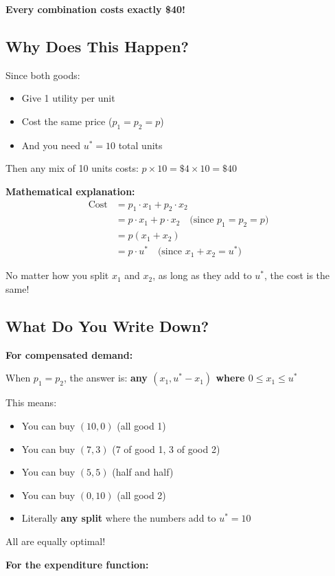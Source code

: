 \documentclass[11pt]{article}
\begin{document}
\textbf{Every combination costs exactly \$40!}

\subsection{Why Does This Happen?}

Since both goods:
\begin{itemize}
\item Give 1 utility per unit
\item Cost the same price ($p_1 = p_2 = p$)
\item And you need $u^* = 10$ total units
\end{itemize}

Then any mix of 10 units costs: $p \times 10 = \$4 \times 10 = \$40$

\textbf{Mathematical explanation:}
\begin{align*}
\text{Cost} &= p_1 \cdot x_1 + p_2 \cdot x_2 \\
&= p \cdot x_1 + p \cdot x_2 \quad \text{(since $p_1 = p_2 = p$)} \\
&= p(x_1 + x_2) \\
&= p \cdot u^* \quad \text{(since $x_1 + x_2 = u^*$)}
\end{align*}

No matter how you split $x_1$ and $x_2$, as long as they add to $u^*$, the cost is the same!

\subsection{What Do You Write Down?}

\textbf{For compensated demand:}

When $p_1 = p_2$, the answer is: \textbf{any $(x_1, u^* - x_1)$ where $0 \leq x_1 \leq u^*$}

This means:
\begin{itemize}
\item You can buy $(10, 0)$ (all good 1)
\item You can buy $(7, 3)$ (7 of good 1, 3 of good 2)
\item You can buy $(5, 5)$ (half and half)
\item You can buy $(0, 10)$ (all good 2)
\item Literally \textbf{any split} where the numbers add to $u^* = 10$
\end{itemize}

All are equally optimal!

\textbf{For the expenditure function:}
\end{document}
